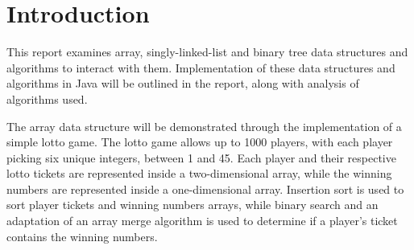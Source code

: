 \section{Introduction}

This report examines array, singly-linked-list and binary tree data structures and algorithms to interact with them. Implementation of these data structures and algorithms in Java will be outlined in the report, along with analysis of algorithms used.

The array data structure will be demonstrated through the implementation of a simple lotto game. The lotto game allows up to 1000 players, with each player picking six unique integers, between 1 and 45. Each player and their respective lotto tickets are represented inside a two-dimensional array, while the winning numbers are represented inside a one-dimensional array. Insertion sort is used to sort player tickets and winning numbers arrays, while binary search and an adaptation of an array merge algorithm is used to determine if a player's ticket contains the winning numbers. 